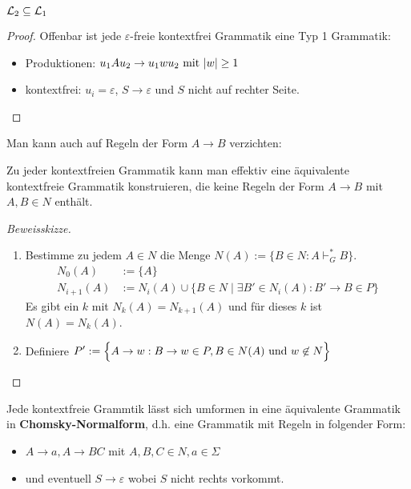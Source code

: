 \begin{korollar}\label{korollar8.10}
	$\L_2\subseteq \L_1$
\end{korollar}

\begin{proof}
	Offenbar ist jede $\varepsilon$-freie kontextfrei Grammatik eine Typ 1 Grammatik:
	\begin{itemize}
		\item Produktionen: $u_1 A u_2\to u_1 wu_2\mit |w|\geq 1$
		\item kontextfrei: $u_i=\varepsilon$, $S\to\varepsilon$ und $S$ nicht auf rechter Seite.
	\end{itemize}
\end{proof}

Man kann auch auf Regeln der Form $A\to B$ verzichten:

\begin{satz}\label{satz8.11}
	Zu jeder kontextfreien Grammatik kann man effektiv eine äquivalente kontextfreie Grammatik konstruieren, die keine Regeln der Form $A\to B$ mit $A,B\in N$ enthält.
\end{satz}

\begin{proof}[Beweisskizze]\
	\begin{enumerate}
		\item Bestimme zu jedem $A\in N$ die Menge $N(A):=\big\lbrace B\in N:A\vdash_G^\ast B\big\rbrace$.
		\begin{align*}
			N_0(A)&:=\lbrace A\rbrace\\
			N_{i+1}(A)&:=N_i(A)\cup\Big\lbrace B\in N\mid\exists B'\in N_i(A):B'\to B\in P\Big\rbrace
		\end{align*}
		Es gibt ein $k$ mit $N_k(A)=N_{k+1}(A)$ und für dieses $k$ ist $N(A)=N_k(A)$.
		\item Definiere $\begin{aligned}
			P':=\Big\lbrace A\to w:B\to w\in P,B\in N(A)\und w\not\in N\Big\rbrace
		\end{aligned}$
	\end{enumerate}
\end{proof}

\begin{satz}[Chomsky-Normalform]\label{atz8.12ChomskyNormalform}\enter
	Jede kontextfreie Grammtik lässt sich umformen in eine äquivalente Grammatik in \textbf{Chomsky-Normalform}, d.h. eine Grammatik mit Regeln in folgender Form:
	\begin{itemize}
		\item $A\to a,A\to BC$ mit $A,B,C\in N,a\in\Sigma$
		\item und eventuell $S\to\varepsilon$ wobei $S$ nicht rechts vorkommt.
	\end{itemize}
\end{satz}

